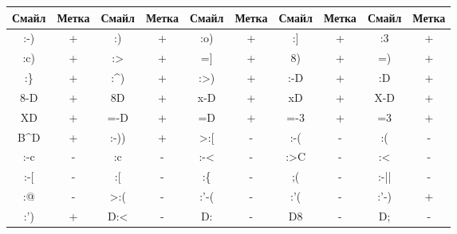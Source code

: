 \begin{table}[h]
\begin{tabular}{|cc|cc|cc|cc|cc|}
\hline
\textbf{Смайл}              & \textbf{Метка} & \textbf{Смайл}         & \textbf{Метка} & \textbf{Смайл}   & \textbf{Метка} & \textbf{Смайл} & \textbf{Метка} & \textbf{Смайл} & \textbf{Метка} \\ \hline
:-)                         & +              & :)                     & +              & :o)              & +              & :{]}           & +              & :3             & +              \\
:c)                         & +              & :\textgreater          & +              & ={]}             & +              & 8)             & +              & =)             & +              \\
:\}                         & +              & :\textasciicircum )    & +              & :>)              & +              & :-D            & +              & :D             & +              \\
8-D                         & +              & 8D                     & +              & x-D              & +              & xD             & +              & X-D            & +              \\
XD                          & +              & =-D                    & +              & =D               & +              & =-3            & +              & =3             & +              \\
B\textasciicircum D         & +              & :-))                   & +              & \textgreater:{[} & -              & :-(            & -              & :(             & -              \\
:-c                         & -              & :c                     & -              & :-\textless      & -              & :>C            & -              & :\textless     & -              \\
:-{[}                       & -              & :{[}                   & -              & :\{              & -              & ;(             & -              & :-||           & -              \\
:@                          & -              & \textgreater:(         & -              & :’-(             & -              & :’(            & -              & :’-)           & +              \\
:')                         & +              & D:\textless            & -              & D:               & -              & D8             & -              & D;             & -              \\

\end{tabular}
\end{table}
